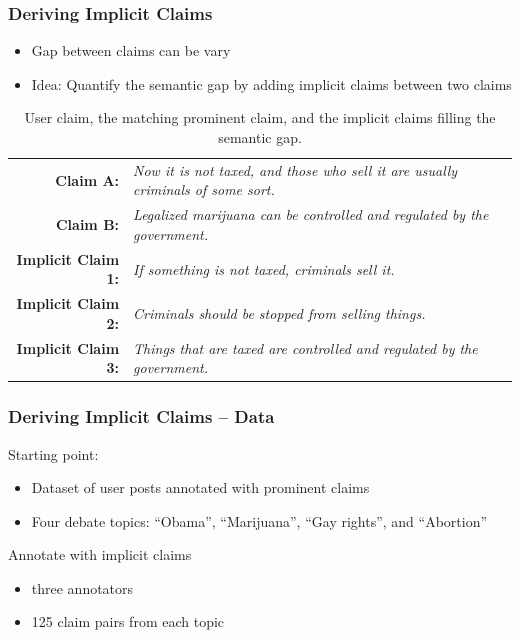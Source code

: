 \documentclass{beamer}
\begin{document}
\begin{frame}
	\frametitle{Deriving Implicit Claims}

	\begin{itemize}
		\item Gap between claims can be vary
		\item Idea: Quantify the semantic gap by adding implicit claims between two claims
	\end{itemize}

\begin{table}
{\scriptsize
\begin{tabular}{|@{\ }r@{\ \  }p{}|}
\hline
\textbf{Claim A:} & \emph{Now it is not taxed, and those who sell it are
	usually criminals of some sort.}\\
\textbf{Claim B:} & \emph{Legalized marijuana can be controlled and
	regulated by the government.}\\
\textbf{Implicit Claim 1:} & \emph{If something is not taxed, criminals sell
	it.}\\
\textbf{Implicit Claim 2:} & \emph{Criminals should be stopped from selling
	things.}\\
\textbf{Implicit Claim 3:} & \emph{Things that are taxed are controlled and
	regulated by the government.}\\
\hline
\end{tabular}}
\caption{User claim, the matching prominent claim, and the implicit claims filling the semantic gap.}
\label{tab:premise_example}
\end{table}
\end{frame}

\begin{frame}
	\frametitle{Deriving Implicit Claims -- Data}
	Starting point:
	\begin{itemize}
		\item  Dataset of user posts annotated with prominent claims \cite{hasan2014you}
		\item Four debate topics:  ``Obama'', ``Marijuana'', ``Gay rights'', and ``Abortion'' 
	\end{itemize}
	Annotate with implicit claims
	\begin{itemize}
		\item three annotators
		\item 125 claim pairs from each topic
	\end{itemize}

\end{frame}
\end{document}
